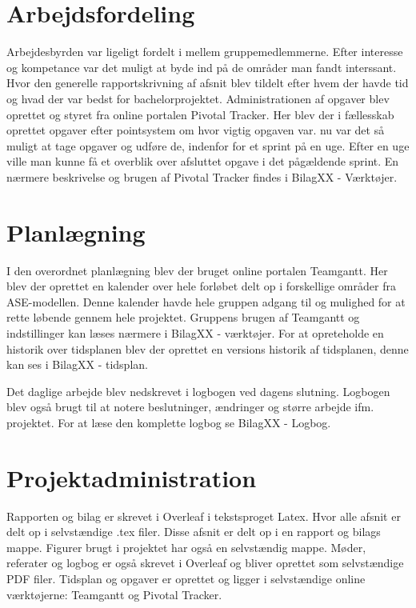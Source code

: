 \chapter{Arbejdsfordeling}
Arbejdesbyrden var ligeligt fordelt i mellem gruppemedlemmerne. Efter interesse og kompetance var det muligt at byde ind på de områder man fandt interssant. Hvor den generelle rapportskrivning af afsnit blev tildelt efter hvem der havde tid og hvad der var bedst for bachelorprojektet. Administrationen  af opgaver blev oprettet og styret fra online portalen Pivotal Tracker. Her blev der i fællesskab oprettet opgaver efter pointsystem om hvor vigtig opgaven var. nu var det så muligt at tage opgaver og udføre de, indenfor for et sprint på en uge. Efter en uge ville man kunne få et overblik over afsluttet opgave i det pågældende sprint. En nærmere beskrivelse og brugen af Pivotal Tracker findes i BilagXX - Værktøjer. 





\chapter{Planlægning}
I den overordnet planlægning blev der bruget online portalen Teamgantt. Her blev der oprettet en kalender over hele forløbet delt op i forskellige områder fra ASE-modellen. Denne kalender havde hele gruppen adgang til og mulighed for at rette løbende gennem hele projektet. Gruppens brugen af Teamgantt og indstillinger kan læses nærmere i BilagXX - værktøjer. For at opreteholde en historik over tidsplanen blev der oprettet en versions historik af tidsplanen, denne kan ses i BilagXX - tidsplan. 

Det daglige arbejde blev nedskrevet i logbogen ved dagens slutning. Logbogen blev også brugt til at notere beslutninger, ændringer og større arbejde ifm. projektet. For at læse den komplette logbog se BilagXX - Logbog.




\chapter{Projektadministration}
Rapporten og bilag er skrevet i Overleaf i tekstsproget Latex. Hvor alle afsnit er delt op i selvstændige .tex filer. Disse afsnit er delt op i en rapport og bilags mappe. Figurer brugt i projektet har også en selvstændig mappe. Møder, referater og logbog er også skrevet i Overleaf og bliver oprettet som selvstændige PDF filer. Tidsplan og opgaver er oprettet og ligger i selvstændige online værktøjerne: Teamgantt og Pivotal Tracker.    


